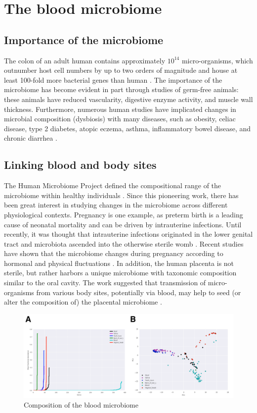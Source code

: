 \chapter{The blood microbiome}

\section{Importance of the microbiome}

The colon of an adult human contains approximately $10^{14}$ micro-organisms, which outnumber host cell numbers by up to two orders of magnitude and house at least 100-fold more bacterial genes than human \cite{Brenchley:2012bm}. The importance of the microbiome has become evident in part through studies of germ-free animals: these animals have reduced vascularity, digestive enzyme activity, and muscle wall thickness. Furthermore, numerous human studies have implicated changes in microbial composition (dysbiosis) with many diseases, such as obesity, celiac disease, type 2 diabetes, atopic eczema, asthma, inflammatory bowel disease, and chronic diarrhea  \cite{Brenchley:2012bm}.

\section{Linking blood and body sites}

The Human Microbiome Project defined the compositional range of the microbiome within healthy individuals \cite{Consortium:2012bb}. Since this pioneering work, there has been great interest in studying changes in the microbiome  across different physiological contexts. Pregnancy is one example, as preterm birth is a leading cause of neonatal mortality and can be driven by intrauterine infections. Until recently, it was thought that intrauterine infections originated in the lower genital tract and microbiota ascended into the otherwise sterile womb \cite{Prince:2014gx}. Recent studies have shown that the microbiome changes during pregnancy according to hormonal and physical fluctuations \cite{Koren:2012ji}. In addition, the human placenta is not sterile, but rather harbors a unique microbiome with taxonomic composition similar to the oral cavity. The work suggested that transmission of micro-organisms from various body sites, potentially via blood, may help to seed (or alter the composition of) the placental microbiome \cite{Aagaard:2014vk}. 

\begin{figure}
\center\includegraphics[width=160mm,scale=0.5]{Figures/Fig12}
\caption{Composition of the blood microbiome}
\label{fig:Fig12}
\end{figure}

